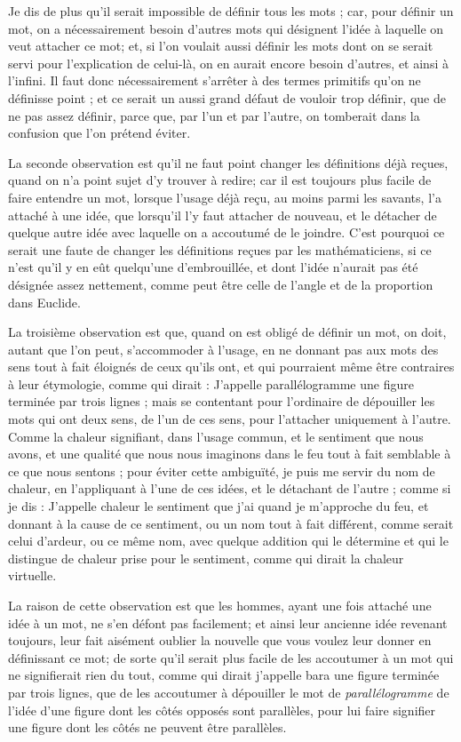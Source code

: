 Je dis de plus qu'il serait impossible de définir tous les mots ; car, pour définir un mot, on a nécessairement besoin d'autres mots qui désignent l'idée à laquelle on veut attacher ce mot; et, si l'on voulait aussi définir les mots dont on se serait servi pour l'explication de celui-là, on en aurait encore besoin d'autres, et ainsi à l'infini. Il faut donc nécessairement s'arrêter à des termes primitifs qu'on ne définisse point ; et ce serait un aussi grand défaut de vouloir trop définir, que de ne pas assez définir, parce que, par l'un et par l'autre, on tomberait dans la confusion que l'on prétend éviter.

La seconde observation est qu'il ne faut point changer les définitions déjà reçues, quand on n'a point sujet d'y trouver à redire; car il est toujours plus facile de faire entendre un mot, lorsque l'usage déjà reçu, au moins parmi les savants, l'a attaché à une idée, que lorsqu'il l'y faut attacher de nouveau, et le détacher de quelque autre idée avec laquelle on a accoutumé de le joindre. C'est pourquoi ce serait une faute de changer les définitions reçues par les mathématiciens, si ce n'est qu'il y en eût quelqu'une d'embrouillée, et dont l'idée n'aurait pas été désignée assez nettement, comme peut être celle de l'angle et de la proportion dans Euclide.

La troisième observation est que, quand on est obligé de définir un mot, on doit, autant que l'on peut, s'accommoder à l'usage, en ne donnant pas aux mots des sens tout à fait éloignés de ceux qu'ils ont, et qui pourraient même être contraires à leur étymologie, comme qui dirait : J'appelle parallélogramme une figure terminée par trois lignes ; mais se contentant pour l'ordinaire de dépouiller les mots qui ont deux sens, de l'un de ces sens, pour l'attacher uniquement à l'autre. Comme la chaleur signifiant, dans l'usage commun, et le sentiment que nous avons, et une qualité que nous nous imaginons dans le feu tout à fait semblable à ce que nous sentons ; pour éviter cette ambiguïté, je puis me servir du nom de chaleur, en l'appliquant à l'une de ces idées, et le détachant de l'autre ; comme si je dis : J'appelle chaleur le sentiment que j'ai quand je m'approche du feu, et donnant à la cause de ce sentiment, ou un nom tout à fait différent, comme serait celui d'ardeur, ou ce même nom, avec quelque addition qui le détermine et qui le distingue de chaleur prise pour le sentiment, comme qui dirait la chaleur virtuelle.

La raison de cette observation est que les hommes, ayant une fois attaché une idée à un mot, ne s'en défont pas facilement; et ainsi leur ancienne idée revenant toujours, leur fait aisément oublier la nouvelle que vous voulez leur donner en définissant ce mot; de sorte qu'il serait plus facile de les accoutumer à un mot qui ne signifierait rien du tout, comme qui dirait j'appelle bara une figure terminée par trois lignes, que de les accoutumer à dépouiller le mot de \emph{parallélogramme} de l'idée d'une figure dont les côtés opposés sont parallèles, pour lui faire signifier une figure dont les côtés ne peuvent être parallèles.

